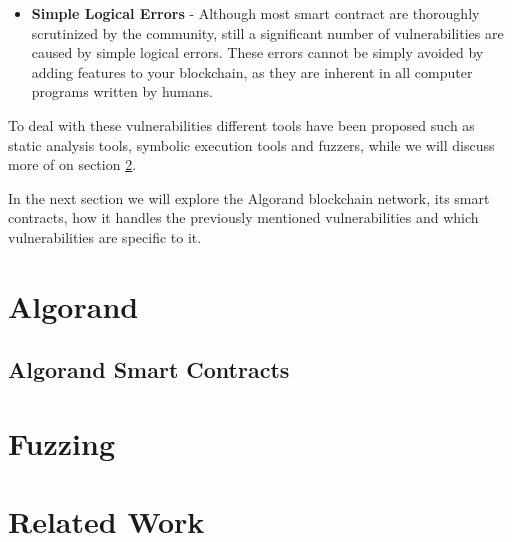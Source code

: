 \begin{itemize}
    \item \textbf{Simple Logical Errors} - Although most smart contract are thoroughly scrutinized by the community, still a significant number of vulnerabilities are caused by simple logical errors. These errors cannot be simply avoided by adding features to your blockchain, as they are inherent in all computer programs written by humans.
\end{itemize}

To deal with these vulnerabilities different tools have been proposed such as static analysis tools, symbolic execution tools and fuzzers, while we will discuss more of on section \ref{section:fuzzing}.

In the next section we will explore the Algorand blockchain network, its smart contracts, how it handles the previously mentioned vulnerabilities and which vulnerabilities are specific to it.

\section{Algorand}

\subsection*{Algorand Smart Contracts}

\section{Fuzzing} \label{section:fuzzing}

\section{Related Work}
